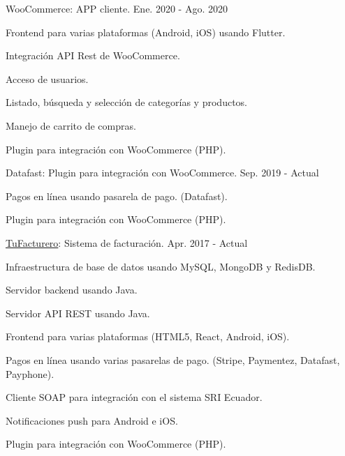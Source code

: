 \begin{cventries}
  \cventry
    {WooCommerce: APP cliente.} %
    {} %
    {} %
    {Ene. 2020 - Ago. 2020} %
    {
      \begin{cvitems} %
        \item {Frontend para varias plataformas (Android, iOS) usando Flutter.}
        \item {Integración API Rest de WooCommerce.}
        \item {Acceso de usuarios.}
        \item {Listado, búsqueda y selección de categorías y productos.}
        \item {Manejo de carrito de compras.}
        \item {Plugin para integración con WooCommerce (PHP).}
      \end{cvitems}
    }

  \cventry
    {Datafast: Plugin para integración con WooCommerce.} %
    {} %
    {} %
    {Sep. 2019 - Actual} %
    {
      \begin{cvitems} %
        \item {Pagos en línea usando pasarela de pago. (Datafast).}
        \item {Plugin para integración con WooCommerce (PHP).}
      \end{cvitems}
    }

  \cventry
    {\href{https://tufacturero.ec}{TuFacturero}: Sistema de facturación.} %
    {} %
    {} %
    {Apr. 2017 - Actual} %
    {
      \begin{cvitems} %
        \item {Infraestructura de base de datos usando MySQL, MongoDB y RedisDB.}
        \item {Servidor backend usando Java.}
        \item {Servidor API REST usando Java.}
        \item {Frontend para varias plataformas (HTML5, React, Android, iOS).}
        \item {Pagos en línea usando varias pasarelas de pago. (Stripe, Paymentez, Datafast, Payphone).}
        \item {Cliente SOAP para integración con el sistema SRI Ecuador.}
        \item {Notificaciones push para Android e iOS.}
        \item {Plugin para integración con WooCommerce (PHP).}
      \end{cvitems}
    }


\end{cventries}
